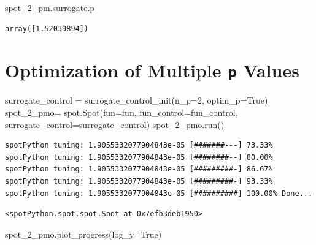 \documentclass[
  letterpaper,
  DIV=11,
  numbers=noendperiod]{scrreprt}
\newenvironment{Shaded}{\begin{snugshade}}{\end{snugshade}}
\newcommand{\DecValTok}[1]{\textcolor[rgb]{0.68,0.00,0.00}{#1}}
\newcommand{\NormalTok}[1]{\textcolor[rgb]{0.00,0.23,0.31}{#1}}
\newcommand{\OperatorTok}[1]{\textcolor[rgb]{0.37,0.37,0.37}{#1}}
\newcommand{\VariableTok}[1]{\textcolor[rgb]{0.07,0.07,0.07}{#1}}
\begin{document}
\begin{Shaded}
\begin{Highlighting}[]
\NormalTok{spot\_2\_pm.surrogate.p}
\end{Highlighting}
\end{Shaded}

\begin{verbatim}
array([1.52039894])
\end{verbatim}

\section{\texorpdfstring{Optimization of Multiple \texttt{p}
Values}{Optimization of Multiple p Values}}\label{optimization-of-multiple-p-values}

\begin{Shaded}
\begin{Highlighting}[]
\NormalTok{surrogate\_control }\OperatorTok{=}\NormalTok{ surrogate\_control\_init(n\_p}\OperatorTok{=}\DecValTok{2}\NormalTok{,}
\NormalTok{                                           optim\_p}\OperatorTok{=}\VariableTok{True}\NormalTok{)}
\NormalTok{spot\_2\_pmo}\OperatorTok{=}\NormalTok{ spot.Spot(fun}\OperatorTok{=}\NormalTok{fun,}
\NormalTok{                    fun\_control}\OperatorTok{=}\NormalTok{fun\_control,}
\NormalTok{                    surrogate\_control}\OperatorTok{=}\NormalTok{surrogate\_control)}
\NormalTok{spot\_2\_pmo.run()}
\end{Highlighting}
\end{Shaded}

\begin{verbatim}
spotPython tuning: 1.9055332077904843e-05 [#######---] 73.33% 
spotPython tuning: 1.9055332077904843e-05 [########--] 80.00% 
spotPython tuning: 1.9055332077904843e-05 [#########-] 86.67% 
spotPython tuning: 1.9055332077904843e-05 [#########-] 93.33% 
spotPython tuning: 1.9055332077904843e-05 [##########] 100.00% Done...
\end{verbatim}

\begin{verbatim}
<spotPython.spot.spot.Spot at 0x7efb3deb1950>
\end{verbatim}

\begin{Shaded}
\begin{Highlighting}[]
\NormalTok{spot\_2\_pmo.plot\_progress(log\_y}\OperatorTok{=}\VariableTok{True}\NormalTok{)}
\end{Highlighting}
\end{Shaded}
\end{document}
